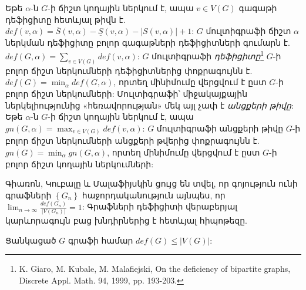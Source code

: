 Եթե $\alpha$-ն $G$-ի ճիշտ կողային ներկում է, ապա $v\in V(G)$ գագաթի դեֆիցիտը հետևյալ թիվն է. $def(v, \alpha)=\overline{S}(v,\alpha) - \underline{S}(v,\alpha) - |S(v,\alpha)| + 1$: $G$ մուլտիգրաֆի ճիշտ $\alpha$ ներկման դեֆիցիտը բոլոր գագաթների դեֆիցիտների գումարն է. $def(G, \alpha) = \sum_{v \in V(G)}{def(v,\alpha)}$: 
$G$ մուլտիգրաֆի \textit{դեֆիցիտը}\footnote{K. Giaro, M. Kubale, M. Malafiejski, On the deficiency of bipartite graphs, Discrete Appl. Math. 94, 1999, pp. 193-203.} $G$-ի բոլոր ճիշտ ներկումների դեֆիցիտներից փոքրագույնն է. $def(G) = \min_{\alpha}{def(G,\alpha)}$, որտեղ մինիմումը վերցվում է ըստ $G$-ի բոլոր ճիշտ ներկումների: Մուլտիգրաֆի՝ միջակայքային ներկելիությունից «հեռավորության» մեկ այլ չափ է \textit{անցքերի թիվը}: Եթե $\alpha$-ն $G$-ի ճիշտ կողային ներկում է, ապա $gn(G, \alpha) = \max_{v \in V(G)}{def(v,\alpha)}$: $G$ մուլտիգրաֆի անցքերի թիվը $G$-ի բոլոր ճիշտ ներկումների անցքերի թվերից փոքրագույնն է. $gn(G) = \min_{\alpha}{gn(G,\alpha)}$, որտեղ մինիմումը վերցվում է ըստ $G$-ի բոլոր ճիշտ կողային ներկումների: 

Գիառոն, Կուբալը և Մալաֆիյսկին ցույց են տվել, որ գոյություն ունի գրաֆների $\left\{G_n\right\}$ հաջորդականություն այնպես, որ $\lim_{n \rightarrow \infty}{\frac{def(G_n)}{|V(G_n)|}} = 1$: Գրաֆների դեֆիցիտի վերաբերյալ կարևորագույն բաց խնդիրներից է հետևյալ հիպոթեզը.
\begin{hypothesis}\label{conj_def}
Ցանկացած $G$ գրաֆի համար $def(G) \leq |V(G)|$:
\end{hypothesis}

